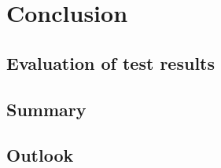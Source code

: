 \chapter{Conclusion} \label{conclusion}
\section{Evaluation of test results}
\section{Summary}
\section{Outlook}